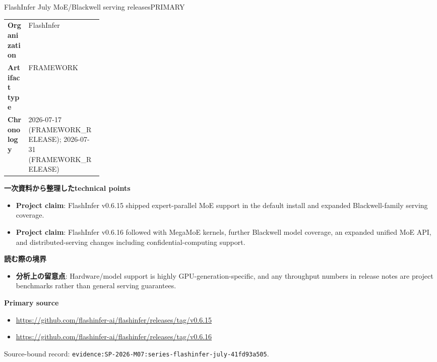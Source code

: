 \begin{technicalnote}{FlashInfer July MoE/Blackwell serving releases}{PRIMARY}
\begin{tabularx}{\linewidth}{@{}>{\bfseries}p{0.22\linewidth}X@{}}
Organization & FlashInfer \\
Artifact type & FRAMEWORK \\
Chronology & 2026-07-17 (FRAMEWORK\_RELEASE); 2026-07-31 (FRAMEWORK\_RELEASE) \\
\end{tabularx}
\smallskip
{\bfseries 一次資料から整理したtechnical points}
\begin{itemize}[leftmargin=1.5em,itemsep=0.35em]
\item \textbf{Project claim}: FlashInfer v0.6.15 shipped expert-parallel MoE support in the default install and expanded Blackwell-family serving coverage.
\item \textbf{Project claim}: FlashInfer v0.6.16 followed with MegaMoE kernels, further Blackwell model coverage, an expanded unified MoE API, and distributed-serving changes including confidential-computing support.
\end{itemize}
{\bfseries 読む際の境界}
\begin{itemize}[leftmargin=1.5em,itemsep=0.35em]
\item \textbf{分析上の留意点}: Hardware/model support is highly GPU-generation-specific, and any throughput numbers in release notes are project benchmarks rather than general serving guarantees.
\end{itemize}
{\bfseries Primary source}
\begingroup\sloppy
\begin{itemize}[leftmargin=1.5em,itemsep=0.25em]
\item {\scriptsize\url{https://github.com/flashinfer-ai/flashinfer/releases/tag/v0.6.15}}
\item {\scriptsize\url{https://github.com/flashinfer-ai/flashinfer/releases/tag/v0.6.16}}
\end{itemize}
\endgroup
{\scriptsize\color{SurveyMuted}Source-bound record: \texttt{evidence:SP-2026-M07:series-flashinfer-july-41fd93a505}.}
\end{technicalnote}
\medskip

